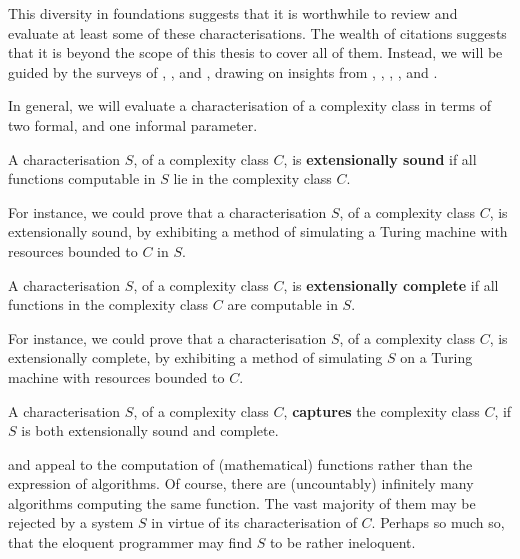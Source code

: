 This diversity in foundations suggests that it is worthwhile to review and
evaluate  at least some of these characterisations. The wealth of citations
suggests that it is beyond the scope of this thesis to cover all of them.
Instead, we will be guided by the surveys of \cite{clote-1999},
\cite{hofmann-2000a}, and \cite{dal-lago-2012}, drawing on insights from
\cite{jones-1999}, \cite{jones-2001}, \cite{niggl-2005},
\cite{niggl-wunderlich-2006}, and \cite{jones-kristiansen-2009}.

In general, we will evaluate a characterisation of a complexity class in terms
of two formal, and one informal parameter.
 
\begin{definition} \label{def:icc-soundness} A characterisation $S$, of a
complexity class $C$, is \textbf{extensionally sound} if all functions
computable in $S$ lie in the complexity class $C$.\end{definition} 

For instance, we could prove that a characterisation $S$, of a complexity class
$C$, is extensionally sound, by exhibiting a method of simulating a Turing
machine with resources bounded to $C$ in $S$.

\begin{definition} \label{def:icc-completeness} A characterisation $S$, of a
complexity class $C$, is \textbf{extensionally complete} if all functions in
the complexity class $C$ are computable in $S$.\end{definition}

For instance, we could prove that a characterisation $S$, of a complexity class
$C$, is extensionally complete, by exhibiting a method of simulating $S$ on a
Turing machine with resources bounded to $C$.

\begin{definition} \label{def:icc-capture} A characterisation $S$, of a
complexity class $C$, \textbf{captures} the complexity class $C$, if $S$ is
both extensionally sound and complete.  \end{definition}

 and  appeal to the computation
of (mathematical) functions rather than the expression of algorithms. Of
course, there are (uncountably) infinitely many algorithms computing the same
function. The vast majority of them may be rejected by a system $S$ in virtue
of its characterisation of $C$. Perhaps so much so, that the eloquent
programmer may find $S$ to be rather ineloquent.


